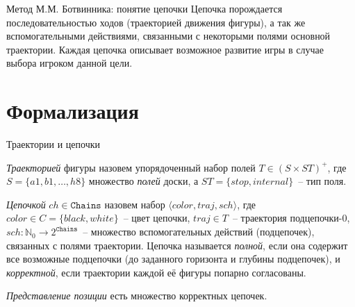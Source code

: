 \documentclass{beamer}
\begin{document}
\begin{frame}{Метод М.М. Ботвинника: понятие цепочки}
Цепочка порождается последовательностью ходов (траекторией движения фигуры), а так же вспомогательными действиями, связанными с некоторыми
полями основной траектории. Каждая цепочка описывает возможное развитие игры в
случае выбора игроком данной цели.
\end{frame}



\section{Формализация}

\begin{frame}{Траектории и цепочки}

\emph{Траекторией} фигуры назовем упорядоченный набор полей ${T} \in \left( {S} \times {ST} \right)^+$, где
${S} = \{a1, b1, \dots, h8\}$ множество \emph{полей} доски, а
${ST} = \{stop, internal\}$~-- тип поля.

\bigskip
\emph{Цепочкой} $ch\in{}\mathtt{Chains}$ назовем набор $\langle color, traj, sch \rangle$,  где $color \in {C}=\{black, white\}$~--  цвет цепочки, $traj \in {T}$~-- траектория подцепочки-0, $sch \colon \mathbb{N}_0 \to 2^{\mathtt{Chains}}$~-- множество вспомогательных действий (подцепочек), связанных с полями траектории.  
Цепочка называется \emph{полной}, если она содержит все возможные
подцепочки (до заданного горизонта и глубины подцепочек), и
\emph{корректной}, если траектории каждой её фигуры попарно согласованы.

\bigskip
\emph{Представление позиции} есть множество корректных цепочек. %
\end{frame}
\end{document}

